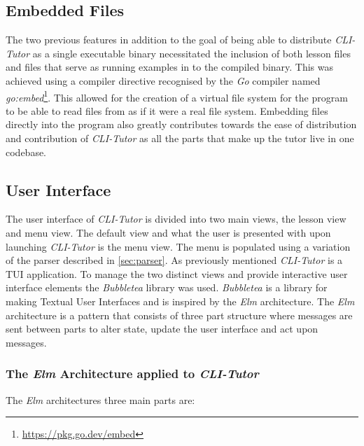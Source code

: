  
\subsection{Embedded Files}

The two previous features in addition to the goal of being able to distribute
\textit{CLI-Tutor} as a single executable binary necessitated the inclusion of
both lesson files and files that serve as running examples in to the compiled
binary. This was achieved using a compiler directive recognised by the \textit{Go}
compiler named \textit{go:embed}\footnote{\url{https://pkg.go.dev/embed}}. This
allowed for the creation of a virtual file system for the program to be able to
read files from as if it were a real file system. Embedding files directly into
the program also greatly contributes towards the ease of distribution and
contribution of \textit{CLI-Tutor} as all the parts that make up the tutor live
in one codebase.

\subsection{User Interface}

The user interface of \textit{CLI-Tutor} is divided into two main views, the
lesson view and menu view. The default view and what the user is presented with
upon launching \textit{CLI-Tutor} is the menu view. The menu is populated using
a variation of the parser described in \autoref{sec:parser}. As previously
mentioned \textit{CLI-Tutor} is a TUI application. To manage the two distinct
views and provide interactive user interface elements the \textit{Bubbletea}
library was used. \textit{Bubbletea} is a library for making Textual User
Interfaces and is inspired by the \textit{Elm} architecture. The \textit{Elm}
architecture is a pattern that consists of three part structure where messages
are sent between parts to alter state, update the user interface and act upon
messages.

\subsubsection{The \textit{Elm} Architecture applied to \textit{CLI-Tutor}} 

The \textit{Elm} architectures three main parts are:

